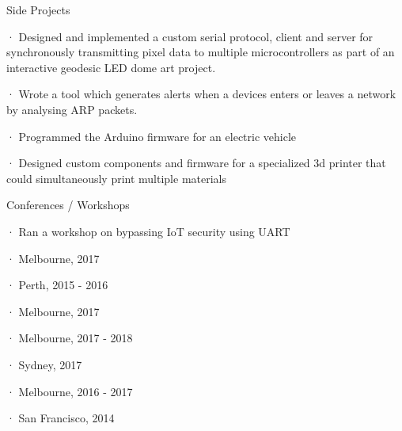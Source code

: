 \begin{cventries}
    \cventry
        {Side Projects}
        {}
        {}
        {}
        {
          \begin{cvitems}
            \item { · Designed and implemented a custom serial protocol, client and server for synchronously transmitting pixel data to multiple microcontrollers as part of an interactive geodesic LED dome art project.}
            \item { · Wrote a tool which generates alerts when a devices enters or leaves a network by analysing ARP packets.}
            \item { · Programmed the Arduino firmware for an electric vehicle}
            \item { · Designed custom components and firmware for a specialized 3d printer that could simultaneously print multiple materials}
          \end{cvitems}
        }



    \cventry
        {Conferences / Workshops}
        {}
        {}
        {}
        {
          \begin{cvitems}
            \item { · Ran a workshop on bypassing IoT security using UART}
            \item { · Melbourne, 2017}
            \item { · Perth, 2015 - 2016}
            \item { · Melbourne, 2017}
            \item { · Melbourne, 2017 - 2018}
            \item { · Sydney, 2017}
            \item { · Melbourne, 2016 - 2017}
            \item { · San Francisco, 2014}
          \end{cvitems}
        }


\end{cventries}

